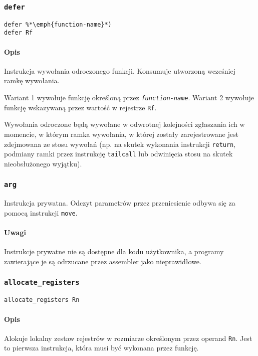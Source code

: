 \subsubsection{\texttt{defer}}

\begin{lstlisting}
defer %*\emph{function-name}*)
defer Rf
\end{lstlisting}

\paragraph*{Opis} Instrukcja wywołania odroczonego funkcji. Konsumuje utworzoną
wcześniej ramkę wywołania.

Wariant 1 wywołuje funkcję określoną przez \texttt{\emph{function-name}}.
Wariant 2 wywołuje funkcję wskazywaną przez wartość w rejestrze \texttt{Rf}.

Wywołania odroczone będą wywołane w odwrotnej kolejności zgłaszania ich w
momencie, w którym ramka wywołania, w której zostały zarejestrowane jest
zdejmowana ze stosu wywołań (np. na skutek wykonania instrukcji \texttt{return},
podmiany ramki przez instrukcję \texttt{tailcall} lub odwinięcia stosu na skutek
nieobsłużonego wyjątku).

\subsubsection{\texttt{arg}}

Instrukcja prywatna.
Odczyt parametrów przez przeniesienie odbywa się za pomocą instrukcji
\texttt{move}.

\paragraph*{Uwagi}

Instrukcje prywatne nie są dostępne dla kodu użytkownika, a programy zawierające
je są odrzucane przez assembler jako nieprawidłowe.

\subsubsection{\texttt{allocate\_registers}}

\begin{lstlisting}
allocate_registers Rn
\end{lstlisting}

\paragraph*{Opis} Alokuje lokalny zestaw rejestrów w rozmiarze określonym przez
operand \texttt{Rn}. Jest to pierwsza instrukcja, która musi być wykonana przez
funkcję.

